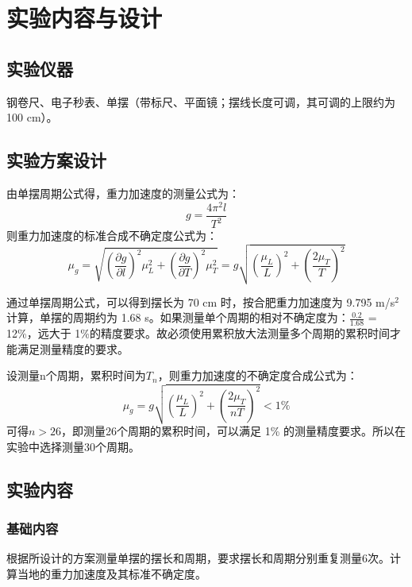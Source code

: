 \documentclass[a4paper]{extarticle}
\begin{document}
    \section{实验内容与设计}
    \subsection{实验仪器}
    \hspace{2em}
    钢卷尺、电子秒表、单摆（带标尺、平面镜；摆线长度可调，其可调的上限约为 100 cm）。
    \subsection{实验方案设计}
    \hspace{2em}
    由单摆周期公式得，重力加速度的测量公式为：
    \begin{equation*}
        g=\frac{4\pi^2l}{T^2}
    \end{equation*}
    则重力加速度的标准合成不确定度公式为：
    \begin{equation*}
        \mu_g=\sqrt{\left(\frac{\partial g}{\partial l}\right)^2\mu_L^2+\left(\frac{\partial g}{\partial T}\right)^2\mu_T^2}=g\sqrt{\left(\frac{\mu_L}{L}\right)^2+\left(\frac{2\mu_T}{T}\right)^2}
    \end{equation*}
    \par\hspace{2em}
    通过单摆周期公式，可以得到摆长为 70 cm 时，按合肥重力加速度为 9.795 m/s$^2$计算，单摆的周期约为 1.68 s。如果测量单个周期的相对不确定度为：$\frac{0.2}{1.68}$ = 12\%，远大于 1\%的精度要求。故必须使用累积放大法测量多个周期的累积时间才能满足测量精度的要求。
    \par\hspace{2em}
    设测量n个周期，累积时间为$T_n$，则重力加速度的不确定度合成公式为：
    \begin{equation*}
        \mu_g=g\sqrt{\left(\frac{\mu_L}{L}\right)^2+\left(\frac{2\mu_T}{nT}\right)^2}<1\%
    \end{equation*}
    可得$n>26$，即测量26个周期的累积时间，可以满足 1\% 的测量精度要求。所以在实验中选择测量30个周期。
    \subsection{实验内容}
    \subsubsection{基础内容}
    \hspace{2em}
    根据所设计的方案测量单摆的摆长和周期，要求摆长和周期分别重复测量6次。计算当地的重力加速度及其标准不确定度。
\end{document}

